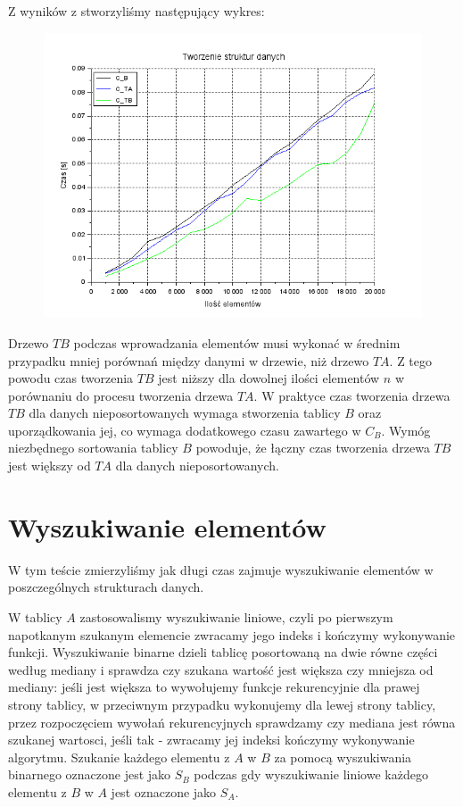 \documentclass{article}
\begin{document}
Z wyników z stworzyliśmy następujący wykres:

\begin{figure}[h]
\centering
  \includegraphics[width=0.5\linewidth]{tworzenie}
  \label{fig:tworzenie}
\end{figure}%

Drzewo $TB$ podczas wprowadzania elementów musi wykonać w średnim przypadku mniej porównań między danymi w drzewie, niż drzewo $TA$. Z tego powodu czas tworzenia $TB$ jest niższy dla dowolnej ilości elementów $n$ w porównaniu do procesu tworzenia drzewa $TA$. W praktyce czas tworzenia drzewa $TB$ dla danych nieposortowanych wymaga stworzenia tablicy $B$ oraz uporządkowania jej, co wymaga dodatkowego czasu zawartego w $C_B$. Wymóg niezbędnego sortowania tablicy $B$ powoduje, że łączny czas tworzenia drzewa $TB$ jest większy od $TA$ dla danych nieposortowanych.

\section{Wyszukiwanie elementów}

W tym teście zmierzyliśmy jak długi czas zajmuje wyszukiwanie elementów w poszczególnych strukturach danych.

W tablicy $A$ zastosowalismy wyszukiwanie liniowe, czyli po pierwszym napotkanym szukanym elemencie zwracamy jego indeks i kończymy wykonywanie funkcji. Wyszukiwanie binarne dzieli tablicę posortowaną na dwie równe części według mediany i sprawdza czy szukana wartość jest większa czy mniejsza od mediany: jeśli jest większa to wywołujemy funkcje rekurencyjnie dla prawej strony tablicy, w przeciwnym przypadku wykonujemy dla lewej strony tablicy, przez rozpoczęciem wywołań rekurencyjnych sprawdzamy czy mediana jest równa szukanej wartosci, jeśli tak - zwracamy jej indeksi kończymy wykonywanie algorytmu. Szukanie każdego elementu z $A$ w $B$ za pomocą wyszukiwania binarnego oznaczone jest jako $S_B$ podczas gdy wyszukiwanie liniowe każdego elementu z $B$ w $A$ jest oznaczone jako $S_A$.
\end{document}
